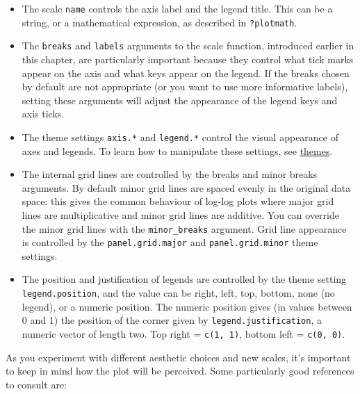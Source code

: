 \begin{itemize}
\itemsep1pt\parskip0pt
\item
  The scale \texttt{name} controls the axis label and the legend title.
  This can be a string, or a mathematical expression, as described in
  \texttt{?plotmath}.
\item
  The \texttt{breaks} and \texttt{labels} arguments to the scale
  function, introduced earlier in this chapter, are particularly
  important because they control what tick marks appear on the axis and
  what keys appear on the legend. If the breaks chosen by default are
  not appropriate (or you want to use more informative labels), setting
  these arguments will adjust the appearance of the legend keys and axis
  ticks. 
\item
  The theme settings \texttt{axis.*} and \texttt{legend.*} control the
  visual appearance of axes and legends. To learn how to manipulate
  these settings, see \hyperref[sec:themes]{themes}.
\item
  The internal grid lines are controlled by the breaks and minor breaks
  arguments. By default minor grid lines are spaced evenly in the
  original data space: this gives the common behaviour of log-log plots
  where major grid lines are multiplicative and minor grid lines are
  additive. You can override the minor grid lines with the
  \texttt{minor\_breaks} argument. Grid line appearance is controlled by
  the \texttt{panel.grid.major} and \texttt{panel.grid.minor} theme
  settings. 
\item
  The position and justification of legends are controlled by the theme
  setting \texttt{legend.position}, and the value can be right, left,
  top, bottom, none (no legend), or a numeric position. The numeric
  position gives (in values between 0 and 1) the position of the corner
  given by \texttt{legend.justification}, a numeric vector of length
  two. Top right = \texttt{c(1, 1)}, bottom left = \texttt{c(0, 0)}.
\end{itemize}


As you experiment with different aesthetic choices and new scales, it's
important to keep in mind how the plot will be perceived. Some
particularly good references to consult are:

